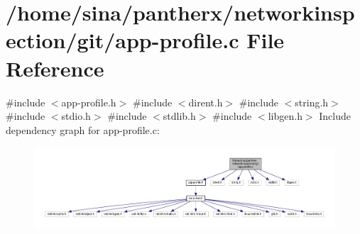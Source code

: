 \hypertarget{app-profile_8c}{}\section{/home/sina/pantherx/networkinspection/git/app-\/profile.c File Reference}
\label{app-profile_8c}
{\ttfamily \#include $<$app-\/profile.\+h$>$}\newline
{\ttfamily \#include $<$dirent.\+h$>$}\newline
{\ttfamily \#include $<$string.\+h$>$}\newline
{\ttfamily \#include $<$stdio.\+h$>$}\newline
{\ttfamily \#include $<$stdlib.\+h$>$}\newline
{\ttfamily \#include $<$libgen.\+h$>$}\newline
Include dependency graph for app-\/profile.c\+:\nopagebreak
\begin{figure}[H]
\begin{center}
\leavevmode
\includegraphics[width=350pt]{app-profile_8c__incl}
\end{center}
\end{figure}
